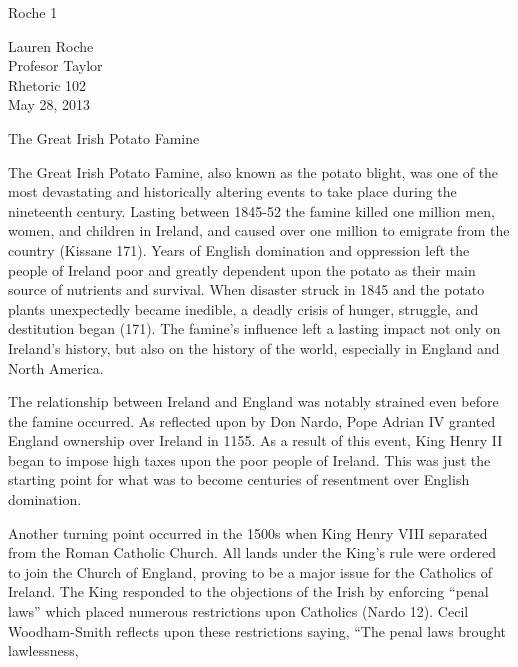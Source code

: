 \newpage

\thispagestyle{empty}
\begin{flushright}Roche 1\end{flushright}
\bigskip
\begin{Spacing}{1.5}
Lauren Roche\\
Profesor Taylor\\
Rhetoric 102\\
May 28, 2013
\end{Spacing}
\begin{center}
The Great Irish Potato Famine
\end{center}
\begin{Spacing}{1.5}

\hspace{.4in}The Great Irish Potato Famine, also known as the potato blight, was one of the most devastating and historically altering events to take place during the nineteenth century. Lasting between 1845-52 the famine killed one million men, women, and children in Ireland, and caused over one million to emigrate from the country (Kissane 171). Years of English domination and oppression left the people of Ireland poor and greatly dependent upon the potato as their main source of nutrients and survival. When disaster struck in 1845 and the potato plants unexpectedly became inedible, a deadly crisis of hunger, struggle, and destitution began (171). The famine’s influence left a lasting impact not only on Ireland’s history, but also on the history of the world, especially in England and North America.

\hspace{.4in}The relationship between Ireland and England was notably strained even before the famine occurred. As reflected upon by Don Nardo, Pope Adrian IV granted England ownership over Ireland in 1155. As a result of this event, King Henry II began to impose high taxes upon the poor people of Ireland. This was just the starting point for what was to become centuries of resentment over English domination. 

\hspace{.4in}Another turning point occurred in the 1500s when King Henry VIII separated from the Roman Catholic Church. All lands under the King’s rule were ordered to join the Church of England, proving to be a major issue for the Catholics of Ireland. The King responded to the objections of the Irish by enforcing “penal laws” which placed numerous restrictions upon Catholics (Nardo 12).  Cecil Woodham-Smith reflects upon these restrictions saying, “The penal laws brought lawlessness, 


\end{Spacing}
